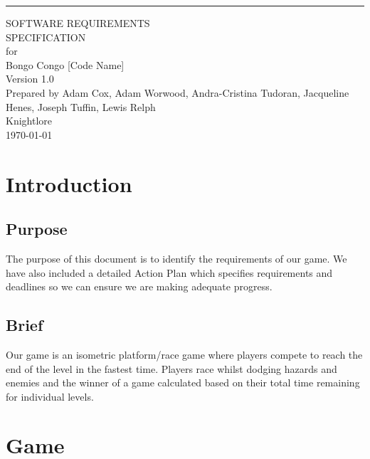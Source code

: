 \documentclass{scrreprt}
\begin{document}
\begin{flushright}
    \rule{14.5cm}{5pt}\vskip1cm
    \begin{bfseries}
        \Huge{SOFTWARE REQUIREMENTS\\ SPECIFICATION}\\
        \vspace{1.7cm}
        for\\
        \vspace{1.7cm}
        Bongo Congo [Code Name]\\
        \vspace{1.7cm}
        \LARGE{Version 1.0}\\
        \vspace{1.7cm}
        Prepared by Adam Cox, Adam Worwood, Andra-Cristina Tudoran, Jacqueline Henes, Joseph Tuffin, Lewis Relph\\
        \vspace{1.7cm}
        Knightlore\\
        \vspace{1.7cm}
        \today\\
    \end{bfseries}
\end{flushright}

\tableofcontents

\chapter{Introduction}
\section{Purpose}
The purpose of this document is to identify the requirements of our game. We have also included a detailed Action Plan which specifies requirements and deadlines so we can ensure we are making adequate progress.

\section{Brief}
Our game is an isometric platform/race game where players compete to reach the end of the level in the fastest time. Players race whilst dodging hazards and enemies and the winner of a game calculated based on their total time remaining for individual levels. 

\chapter{Game}
\end{document}
